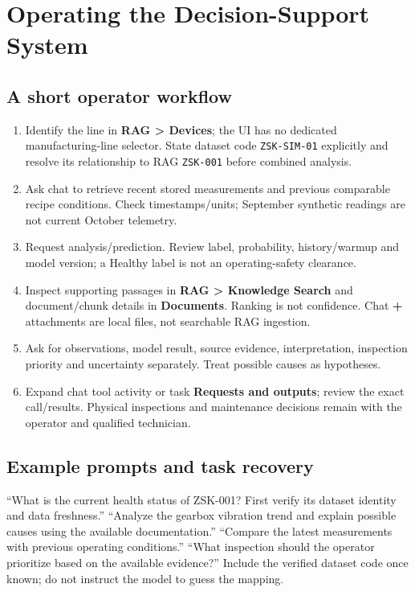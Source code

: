 \chapter{Operating the Decision-Support System}
\section{A short operator workflow}
\begin{enumerate}
\item Identify the line in \textbf{RAG > Devices}; the UI has no dedicated manufacturing-line selector. State dataset code \texttt{ZSK-SIM-01} explicitly and resolve its relationship to RAG \texttt{ZSK-001} before combined analysis.
\item Ask chat to retrieve recent stored measurements and previous comparable recipe conditions. Check timestamps/units; September synthetic readings are not current October telemetry.
\item Request analysis/prediction. Review label, probability, history/warmup and model version; a Healthy label is not an operating-safety clearance.
\item Inspect supporting passages in \textbf{RAG > Knowledge Search} and document/chunk details in \textbf{Documents}. Ranking is not confidence. Chat \textbf{+} attachments are local files, not searchable RAG ingestion.
\item Ask for observations, model result, source evidence, interpretation, inspection priority and uncertainty separately. Treat possible causes as hypotheses.
\item Expand chat tool activity or task \textbf{Requests and outputs}; review the exact call/results. Physical inspections and maintenance decisions remain with the operator and qualified technician.
\end{enumerate}
\section{Example prompts and task recovery}
``What is the current health status of ZSK-001? First verify its dataset identity and data freshness.'' ``Analyze the gearbox vibration trend and explain possible causes using the available documentation.'' ``Compare the latest measurements with previous operating conditions.'' ``What inspection should the operator prioritize based on the available evidence?'' Include the verified dataset code once known; do not instruct the model to guess the mapping.

